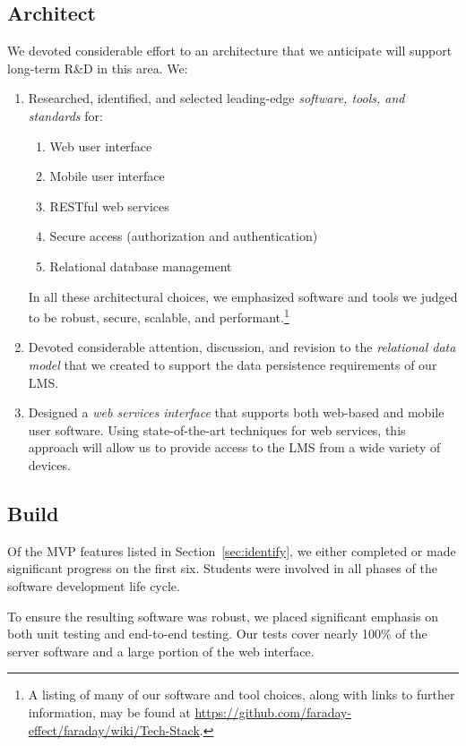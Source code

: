 \documentclass{article}
\begin{document}
\subsection{Architect}

We devoted considerable effort
to an architecture that we anticipate
will support long-term R\&D in this area.
We:
\begin{enumerate}
\item Researched, identified, and selected
  leading-edge \emph{software, tools, and standards} for:
  \begin{enumerate}
  \item Web user interface
  \item Mobile user interface
  \item RESTful web services
  \item Secure access (authorization and authentication)
  \item Relational database management
  \end{enumerate}
  In all these architectural choices,
  we emphasized software and tools we judged to be
  robust, secure, scalable, and performant.\footnote{A
    listing of many of our software and tool choices, along with
    links to further information, may be found at
    \url{https://github.com/faraday-effect/faraday/wiki/Tech-Stack}.}
\item Devoted considerable attention, discussion, and revision
  to the \emph{relational data model} that we created
  to support the data persistence requirements
  of our LMS.
\item Designed a \emph{web services interface}
  that supports both web-based and mobile
  user software.
  Using state-of-the-art techniques for web services,
  this approach will allow us to provide access
  to the LMS from a wide variety of devices.
\end{enumerate}

\subsection{Build}

Of the MVP features listed in Section~\ref{sec:identify},
we either completed or made significant progress
on the first six.
Students were involved in all phases
of the software development life cycle.

To ensure the resulting software was robust,
we placed significant emphasis on
both unit testing and end-to-end testing.
Our tests cover nearly 100\% of the server software
and a large portion of the web interface.
\end{document}

